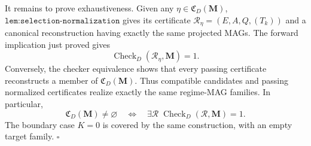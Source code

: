 It remains to prove exhaustiveness.  Given any \(\eta\in\mathfrak C_D(\mathbf M)\), \(\texttt{lem:selection-normalization}\) gives its certificate \(\mathcal R_\eta=(E,A,Q,(T_k))\) and a canonical reconstruction having exactly the same projected MAGs.  The forward implication just proved gives
\[
\operatorname{Check}_{D}(\mathcal R_\eta,\mathbf M)=1.
\]
Conversely, the checker equivalence shows that every passing certificate reconstructs a member of \(\mathfrak C_D(\mathbf M)\).  Thus compatible candidates and passing normalized certificates realize exactly the same regime-MAG families.  In particular,
\[
\mathfrak C_D(\mathbf M)\ne\varnothing
\quad\Longleftrightarrow\quad
\exists\mathcal R\;\operatorname{Check}_{D}(\mathcal R,\mathbf M)=1.
\]
The boundary case \(K=0\) is covered by the same construction, with an empty target family. \(\square\)